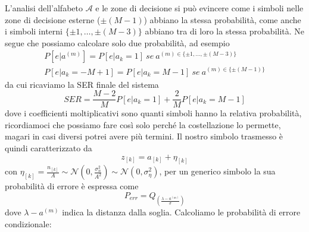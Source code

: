             L'analisi dell'alfabeto $\mathcal{A}$ e le zone di decisione si può evincere come i simboli 
            nelle zone di decisione esterne ($\pm(M-1)$) abbiano la stessa probabilità, come anche i 
            simboli interni $\{\pm 1,\dots,\pm (M-3)\}$ abbiano tra di loro la stessa probabilità. Ne segue che 
            possiamo calcolare solo due probabilità, ad esempio
            \begin{gather}
                P[e|a^{(m)}] = P[e|a_k = 1]\ se\ a^{(m)\in\{\pm 1,\dots,\pm (M-3)\}}\nonumber \\
                P[e|a_k =-M+1] = P[e|a_k = M-1]\ se\ a^{(m)\in\{\pm (M-1)\}}\nonumber
            \end{gather}
            da cui ricaviamo la SER finale del sistema
            \[
                SER =  \frac{M-2}{M}P[e|a_k = 1]+ \frac{2}{M}P[e|a_k = M-1]
            \]
            dove i coefficienti moltiplicativi sono quanti simboli hanno la relativa probabilità, ricordiamoci
            che possiamo fare così solo perché la costellazione lo permette, magari in casi diversi potrei
            avere più termini. Il nostro simbolo trasmesso è quindi caratterizzato da
            \[
                z_{[k]} = a_{[k]} + \eta_{[k]}
            \]
            con $\eta_{[k]} = \frac{n_{[k]}}{A} \sim \mathcal{N}(0,\frac{\sigma_n^2}{A^2})\sim \mathcal{N}(0,\sigma_\eta^2)$,
            per un generico simbolo la sua probabilità di errore è espressa come 
            \[
                P_{err} = Q_{\displaystyle\left(\frac{\lambda - a^{(m)}}{\sigma}\right)}    
            \]
            dove $\lambda - a^{(m)}$ indica la distanza dalla soglia.
            Calcoliamo le probabilità di errore condizionale:
